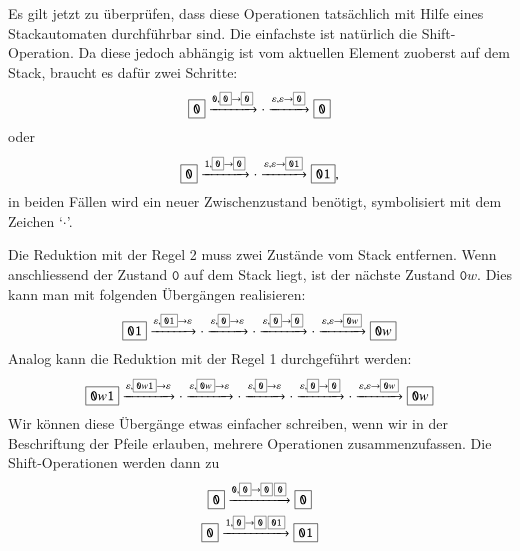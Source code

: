 Es gilt jetzt zu überprüfen, dass diese Operationen tatsächlich mit
Hilfe eines Stackautomaten durchführbar sind. Die einfachste ist natürlich
die Shift-Ope\-ration. Da diese jedoch abhängig ist vom aktuellen Element zuoberst
auf dem Stack, braucht es dafür zwei Schritte:
\[
\boxed{\texttt{0}}\xrightarrow{\texttt{0},\scalebox{0.7}{\boxed{\texttt{0}}$\rightarrow$\boxed{\texttt{0}}}}\cdot
\xrightarrow{\varepsilon,\varepsilon\rightarrow\scalebox{0.7}{\boxed{\texttt{0}}}}\boxed{\texttt{0}}
\]
oder
\[
\boxed{\texttt{0}}\xrightarrow{\texttt{1},\scalebox{0.7}{\boxed{\texttt{0}}$\rightarrow$\boxed{\texttt{0}}}}\cdot
\xrightarrow{\varepsilon,\varepsilon\rightarrow\scalebox{0.7}{\boxed{\texttt{01}}}}\boxed{\texttt{01}},
\]
in beiden Fällen wird ein neuer Zwischenzustand benötigt, symbolisiert mit dem Zeichen
`$\cdot$'.

Die Reduktion mit der Regel 2 muss zwei Zustände vom Stack entfernen.
Wenn anschliessend der Zustand $\boxed{\texttt{0}}$ auf dem Stack liegt, ist der
nächste Zustand $\boxed{\texttt{0}w}$. Dies kann man mit folgenden Übergängen
realisieren:
\[
\boxed{\texttt{01}}
\xrightarrow{\varepsilon,\scalebox{0.7}{\boxed{\texttt{01}}}\to\varepsilon}
\cdot
\xrightarrow{\varepsilon,\scalebox{0.7}{\boxed{\texttt{0}}}\to\varepsilon}
\cdot
\xrightarrow{\varepsilon,\scalebox{0.7}{\boxed{\texttt{0}}}\to\scalebox{0.7}{\boxed{\texttt{0}}}}
\cdot
\xrightarrow{\varepsilon,\varepsilon\to\scalebox{0.7}{\boxed{\texttt{0}w}}}
\boxed{\texttt{0}w}
\]
Analog kann die Reduktion mit der Regel 1 durchgeführt werden:
\[
\boxed{\texttt{0}w\texttt{1}}
\xrightarrow{\varepsilon,\scalebox{0.7}{\boxed{\texttt{0}w\texttt{1}}}\to\varepsilon}
\cdot
\xrightarrow{\varepsilon,\scalebox{0.7}{\boxed{\texttt{0}w}}\to\varepsilon}
\cdot
\xrightarrow{\varepsilon,\scalebox{0.7}{\boxed{\texttt{0}}}\to\varepsilon}
\cdot
\xrightarrow{\varepsilon,\scalebox{0.7}{\boxed{\texttt{0}}}\to\scalebox{0.7}{\boxed{\texttt{0}}}}
\cdot
\xrightarrow{\varepsilon,\varepsilon\to\scalebox{0.7}{\boxed{\texttt{0}w}}}
\boxed{\texttt{0}w}
\]
Wir können diese Übergänge etwas einfacher schreiben, wenn wir in der
Beschriftung der Pfeile erlauben, mehrere Operationen zusammenzufassen.
Die Shift-Ope\-rationen werden dann zu
\begin{gather*}
\boxed{\texttt{0}}\xrightarrow{\texttt{0},\scalebox{0.7}{\boxed{\texttt{0}}$\rightarrow$\boxed{\texttt{0}}\,\boxed{\texttt{0}}}}\boxed{\texttt{0}}
\\
\boxed{\texttt{0}}\xrightarrow{\texttt{1},\scalebox{0.7}{\boxed{\texttt{0}}$\rightarrow$\boxed{\texttt{0}}\,\boxed{\texttt{01}}}}\boxed{\texttt{01}}
\end{gather*}
